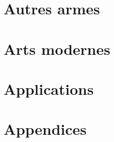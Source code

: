 \documentclass[10pt, a4paper, oneside, titlepage]{book}
\begin{document}


% 
% 
% 


\part{Autres armes}



% 


\part{Arts modernes}


% 


\part{Applications}
\label{part:applications}



% 




\appendix


\part{Appendices}









\printbibliography[heading=bibintoc]
\printindex
\end{document}
